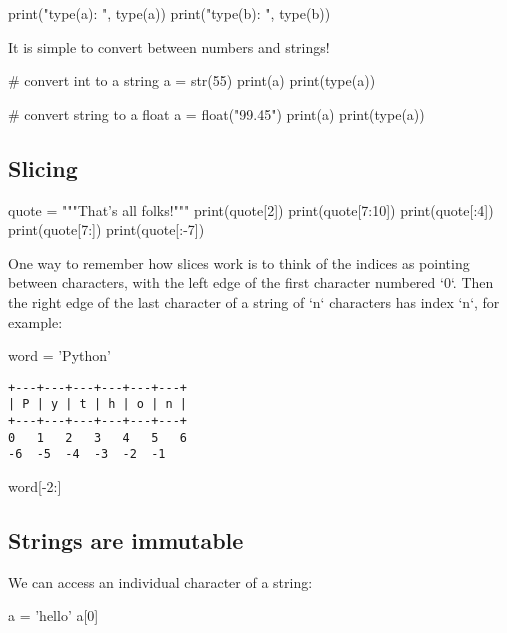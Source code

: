 \documentclass[12pt]{article} \newif\ifsolution\solutiontrue %
\begin{document}
\begin{python}
print("type(a): ", type(a))
print("type(b): ", type(b))
\end{python}

It is simple to convert between numbers and strings!

\begin{python}
# convert int to a string
a = str(55)
print(a)
print(type(a))
\end{python}

\begin{python}
# convert string to a float
a = float("99.45")
print(a)
print(type(a))
\end{python}

\subsection{Slicing}

\begin{python}
quote = """That's all folks!"""
print(quote[2])
print(quote[7:10])
print(quote[:4])
print(quote[7:])
print(quote[:-7])
\end{python}

One way to remember how slices work is to think of the indices as pointing
between characters, with the left edge of the first character numbered `0`. Then
the right edge of the last character of a string of `n` characters has index
`n`, for example:

\begin{python}
word = 'Python'
\end{python}

\begin{verbatim}
+---+---+---+---+---+---+
| P | y | t | h | o | n |
+---+---+---+---+---+---+
0   1   2   3   4   5   6
-6  -5  -4  -3  -2  -1
\end{verbatim}

\begin{python}
word[-2:]
\end{python}

\subsection{Strings are immutable}

We can access an individual character of a string:

\begin{python}
a = 'hello'
a[0]
\end{python}
\end{document}
